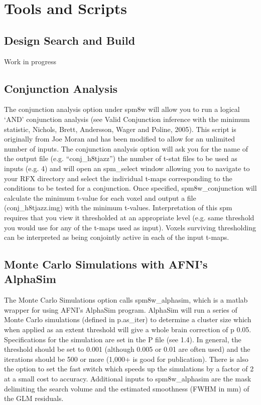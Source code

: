 \documentclass[12pt]{article}
\begin{document}
\section{Tools and Scripts}
\secttoc %
\subsection{Design Search and Build}
Work in progress
\subsection{Conjunction Analysis}
The conjunction analysis option under spm8w will allow you to run a logical ‘AND’ conjunction analysis (see Valid Conjunction inference with the minimum statistic, Nichols, Brett, Andersson, Wager and Poline, 2005). This script is originally from Joe Moran and has been modified to allow for an unlimited number of inputs. The conjunction analysis option will ask you for the name of the output file (e.g. “conj\_h8tjazz”) the number of t-stat files to be used as inputs (e.g. 4) and will open an spm\_select window allowing you to navigate to your RFX directory and select the individual t-maps corresponding to the conditions to be tested for a conjunction. 
Once specified, spm8w\_conjunction will calculate the minimum t-value for each voxel and output a file (conj\_h8tjazz.img) with the minimum t-values. Interpretation of this spm requires that you view it thresholded at an appropriate level (e.g. same threshold you would use for any of the t-maps used as input). Voxels surviving thresholding can be interpreted as being conjointly active in each of the input t-maps.

\subsection{Monte Carlo Simulations with AFNI's AlphaSim}
The Monte Carlo Simulations option calls spm8w\_alphasim, which is a matlab wrapper for using AFNI’s AlphaSim program. AlphaSim will run a series of Monte Carlo simulations (defined in p.as\_iter) to determine a cluster size which when applied as an extent threshold will give a whole brain correction of p 0.05. Specifications for the simulation are set in the P file (see 1.4). In general, the threshold should be set to 0.001 (although 0.005 or 0.01 are often used) and the iterations should be 500 or more (1,000+ is good for publication). There is also the option to set the fast switch which speeds up the simulations by a factor of 2 at a small cost to accuracy. Additional inputs to spm8w\_alphasim are the mask delimiting the search volume and the estimated smoothness (FWHM in mm) of the GLM residuals. 
\end{document}
